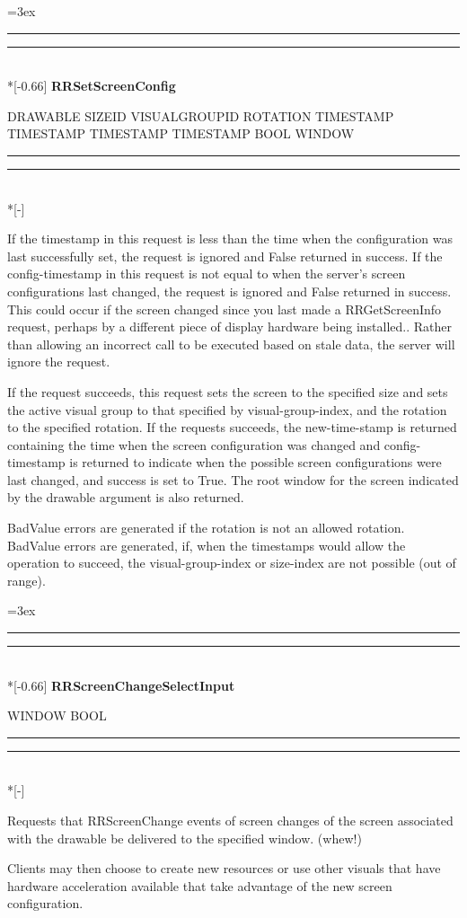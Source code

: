 \documentclass[twocolumn]{article}
\newlength{\croplength}
\newlength{\cropweight}
\newenvironment{Xrequest}[1]{%
  \croplength=3ex
  \hspace*{1.5\croplength}\begin{minipage}{\textwidth}
  \cropweight=0.25pt
  \hspace*{-1.5\croplength}%
  \rule[-\croplength]{\cropweight}{\croplength}%
  \rule[-\cropweight]{\croplength}{\cropweight}\\*[-0.66\croplength]%
  \textbf{#1}%
  \begin{list}{}{%
    \renewcommand{\makelabel}[1]{{##1:~}}%
    \newcommand{\Xparam}[1]{\item[\textit{##1}]}
    \newcommand{\Xreply}{\\\hspace*{-\leftmargin}$\rightarrow$}
    \newcommand{\Xerror}[1]{\vspace{5pt}\item[Errors] \texttt{##1}}
    \labelwidth=0pt
    \labelsep=0pt
    \parsep=0pt
    \itemsep=0pt
    \listparindent=0pt
  }}
  {\end{list}%
  \vspace{-\baselineskip}%
  \hspace*{-1.5\croplength}%
  \rule[\croplength]{\cropweight}{\croplength}%
  \rule[\croplength]{\croplength}{\cropweight}\\*[-\croplength]%
  \end{minipage}\vspace*{-\baselineskip}}
\begin{document}
\begin{Xrequest}{RRSetScreenConfig}
 DRAWABLE
 SIZEID
 VISUALGROUPID
 ROTATION
 TIMESTAMP
 TIMESTAMP
\Xreply
{} TIMESTAMP
 TIMESTAMP
 BOOL
 WINDOW
\end{Xrequest}

If the timestamp in this request is less than the time when the
configuration was last successfully set, the request is ignored and
False returned in success.  If the config-timestamp in this request is
not equal to when the server's screen configurations last changed, the
request is ignored and False returned in success.  This could occur if
the screen changed since you last made a RRGetScreenInfo request,
perhaps by a different piece of display hardware being installed..
Rather than allowing an incorrect call to be executed based on stale
data, the server will ignore the request.

If the request succeeds, this request sets the screen to the specified
size and sets the active visual group to that specified by
visual-group-index, and the rotation to the specified rotation. If the
requests succeeds, the new-time-stamp is returned containing the time
when the screen configuration was changed and config-timestamp is
returned to indicate when the possible screen configurations were last
changed, and success is set to True.  The root window for the screen
indicated by the drawable argument is also returned.

BadValue errors are generated if the rotation is not an allowed
rotation. BadValue errors are generated, if, when the timestamps would
allow the operation to succeed, the visual-group-index or size-index
are not possible (out of range).

\begin{Xrequest}{RRScreenChangeSelectInput}
 WINDOW
 BOOL
\end{Xrequest}

Requests that RRScreenChange events of screen changes of the screen
associated with the drawable be delivered to the specified window. (whew!)

Clients may then choose to create new resources or use other visuals
that have hardware acceleration available that take advantage of
the new screen configuration.
\end{document}
